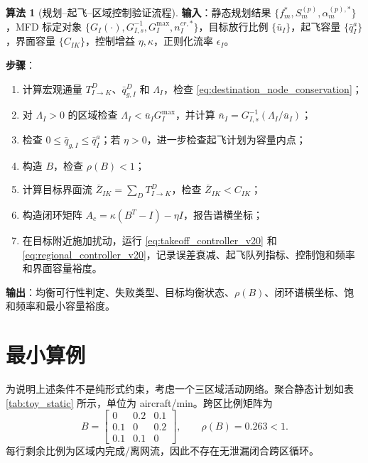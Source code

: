 \documentclass[a4paper,12pt]{article}
\theoremstyle{plain}
\theoremstyle{definition}
\newtheorem{algorithm}[theorem]{算法}
\theoremstyle{remark}
\begin{document}
\begin{algorithm}[规划--起飞--区域控制验证流程]\label{alg:network_feasibility_stability}
\textbf{输入}：静态规划结果 $\{f_m^*,S_m^{(p)},\alpha_m^{(p),*}\}$，MFD 标定对象 $\{G_I(\cdot),G_{I,s}^{-1},G_I^{\max},n_I^{cr,*}\}$，目标放行比例 $\{\bar u_I\}$，起飞容量 $\{\bar q_I^a\}$，界面容量 $\{C_{IK}\}$，控制增益 $\eta,\kappa$，正则化流率 $\epsilon_I$。

\textbf{步骤}：
\begin{enumerate}
    \item 计算宏观通量 $T_{I\to K}^D$、$\bar q_{g,I}^D$ 和 $\Lambda_I$，检查 \eqref{eq:destination_node_conservation}；
    \item 对 $\Lambda_I>0$ 的区域检查 $\Lambda_I<\bar u_I G_I^{\max}$，并计算 $\bar n_I=G_{I,s}^{-1}(\Lambda_I/\bar u_I)$；
    \item 检查 $0\le \bar q_{g,I}\le\bar q_I^a$；若 $\eta>0$，进一步检查起飞计划为容量内点；
    \item 构造 $B$，检查 $\rho(B)<1$；
    \item 计算目标界面流 $\bar Z_{IK}=\sum_D T_{I\to K}^D$，检查 $\bar Z_{IK}<C_{IK}$；
    \item 构造闭环矩阵 $A_c=\kappa(B^T-I)-\eta I$，报告谱横坐标；
    \item 在目标附近施加扰动，运行 \eqref{eq:takeoff_controller_v20} 和 \eqref{eq:regional_controller_v20}，记录误差衰减、起飞队列指标、控制饱和频率和界面容量裕度。
\end{enumerate}

\textbf{输出}：均衡可行性判定、失败类型、目标均衡状态、$\rho(B)$、闭环谱横坐标、饱和频率和最小容量裕度。
\end{algorithm}

\section{最小算例}

为说明上述条件不是纯形式约束，考虑一个三区域活动网络。聚合静态计划如表 \ref{tab:toy_static} 所示，单位为 aircraft/min。跨区比例矩阵为
\begin{equation}
    B=
    \begin{bmatrix}
    0 & 0.2 & 0.1\\
    0.1 & 0 & 0.2\\
    0.1 & 0.1 & 0
    \end{bmatrix},
    \qquad
    \rho(B)=0.263<1.
\end{equation}
每行剩余比例为区域内完成/离网流，因此不存在无泄漏闭合跨区循环。
\end{document}
